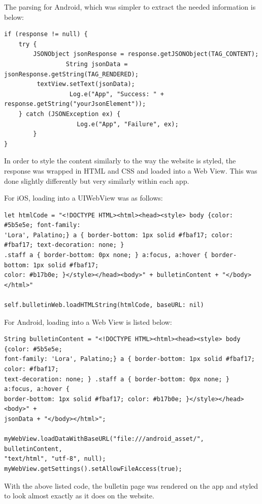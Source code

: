 \documentclass[letterpaper,10pt,draftclsnofoot,onecolumn,titlepage]{IEEEtran}
\begin{document}
		The parsing for Android, which was simpler to extract the needed information is below: 
		
		\begin{lstlisting}
if (response != null) {
	try {
		JSONObject jsonResponse = response.getJSONObject(TAG_CONTENT);
                 String jsonData = jsonResponse.getString(TAG_RENDERED);
		 textView.setText(jsonData);                   
                  Log.e("App", "Success: " + response.getString("yourJsonElement"));
	} catch (JSONException ex) {
                    Log.e("App", "Failure", ex);
        }
}
	\end{lstlisting}
	

		In order to style the content similarly to the way the website is styled, the response was wrapped in HTML and CSS and loaded into a Web View.
		This was done slightly differently but very similarly within each app. 

		For iOS, loading into a UIWebView was as follows: 
		\begin{lstlisting}
let htmlCode = "<!DOCTYPE HTML><html><head><style> body {color: #5b5e5e; font-family: 
'Lora', Palatino;} a { border-bottom: 1px solid #fbaf17; color: #fbaf17; text-decoration: none; } 
.staff a { border-bottom: 0px none; } a:focus, a:hover { border-bottom: 1px solid #fbaf17; 
color: #b17b0e; }</style></head><body>" + bulletinContent + "</body></html>"
                
self.bulletinWeb.loadHTMLString(htmlCode, baseURL: nil)
		\end{lstlisting}
		
		For Android, loading into a Web View is listed below: 
		\begin{lstlisting}
String bulletinContent = "<!DOCTYPE HTML><html><head><style> body {color: #5b5e5e; 
font-family: 'Lora', Palatino;} a { border-bottom: 1px solid #fbaf17; color: #fbaf17; 
text-decoration: none; } .staff a { border-bottom: 0px none; } a:focus, a:hover { 
border-bottom: 1px solid #fbaf17; color: #b17b0e; }</style></head><body>" + 
jsonData + "</body></html>";

myWebView.loadDataWithBaseURL("file:///android_asset/", bulletinContent, 
"text/html", "utf-8", null);
myWebView.getSettings().setAllowFileAccess(true);
		\end{lstlisting}
		
		With the above listed code, the bulletin page was rendered on the app and styled to look almost exactly as it does on the website. 
		
		
		
\end{document}
